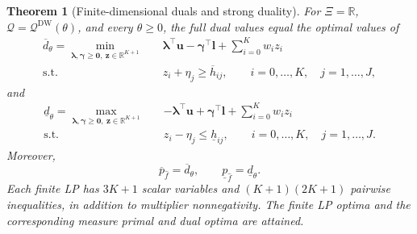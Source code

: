 \documentclass[review,11pt,3p,authoryear,nopreprintline]{elsarticle}
\newtheorem{theorem}{Theorem}
\begin{document}
\begin{theorem}[Finite-dimensional duals and strong duality]
  \label{thm-finite-dual-reformulations}
  For $\Xi=\mathbb R$, $\mathscr Q=\mathscr Q^{\mathrm{DW}}(\theta)$, and every $\theta\ge0$, the full dual values equal the optimal values of
  \begin{equation}
    \begin{aligned}
      \overline d_\theta
      =\min_{\bm\lambda,\bm\gamma\ge\bm 0,\ \bm z\in\mathbb R^{K+1}}\quad&
        \bm\lambda^\top\bm u-\bm\gamma^\top\bm l+\sum_{i=0}^K w_i z_i\\
      \text{s.t.}\quad&
        z_i+\eta_j\ge\overline h_{ij},
        \qquad i=0,\ldots,K,\quad j=1,\ldots,J,
    \end{aligned}
    \label{eq-finite-upper-dual}
  \end{equation}
  and
  \begin{equation}
    \begin{aligned}
      \underline d_\theta
      =\max_{\bm\lambda,\bm\gamma\ge\bm 0,\ \bm z\in\mathbb R^{K+1}}\quad&
        -\bm\lambda^\top\bm u+\bm\gamma^\top\bm l+\sum_{i=0}^K w_i z_i\\
      \text{s.t.}\quad&
        z_i-\eta_j\le\underline h_{ij},
        \qquad i=0,\ldots,K,\quad j=1,\ldots,J.
    \end{aligned}
    \label{eq-finite-lower-dual}
  \end{equation}
  Moreover,
  \begin{equation}
    \overline p_{\hat f}=\overline d_\theta,\qquad
    \underline p_{\hat f}=\underline d_\theta.
    \label{eq-strong-duality}
  \end{equation}
  Each finite LP has $3K+1$ scalar variables and $(K+1)(2K+1)$ pairwise inequalities, in addition to multiplier nonnegativity. The finite LP optima and the corresponding measure primal and dual optima are attained.
\end{theorem}
\end{document}
